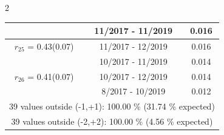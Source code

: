 \begin{multicols}{2}
{\begin{tabular}{ccc}
&       11/2017 - 11/2019 &        0.016  \vspace{-.02in} \\ \hline 
  $r_{25}$ = 0.43(0.07) &      11/2017 - 12/2019 &        0.016   \vspace{-.10in} \\  
&       10/2017 - 11/2019 &        0.014  \vspace{-.02in} \\ \hline 
  $r_{26}$ = 0.41(0.07) &      10/2017 - 12/2019 &        0.014   \vspace{-.10in} \\  
&        8/2017 - 10/2019 &        0.012  \vspace{-.02in} \\ \hline 
\multicolumn{3}{c}{              39 values outside (-1,+1): 100.00  \% (31.74  \% expected)}\vspace{-.10in} \\ 
\multicolumn{3}{c}{              39 values outside (-2,+2): 100.00 \%  (4.56 \% expected) } \\
 \end{tabular} \\ 
 } 
\end{multicols} 
